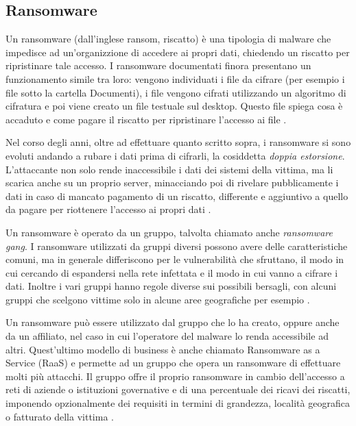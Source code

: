 \documentclass[12pt]{article}
\begin{document}
\subsection{Ransomware}

Un ransomware (dall'inglese ransom, riscatto) è una tipologia di malware che impedisce ad un'organizzione di accedere ai propri dati, chiedendo un riscatto per ripristinare tale accesso. I ransomware documentati finora presentano un funzionamento simile tra loro: vengono individuati i file da cifrare (per esempio i file sotto la cartella Documenti), i file vengono cifrati utilizzando un algoritmo di cifratura e poi viene creato un file testuale sul desktop. Questo file spiega cosa è accaduto e come pagare il riscatto per ripristinare l'accesso ai file \cite{noauthor_ransomware_2021}.

Nel corso degli anni, oltre ad effettuare quanto scritto sopra, i ransomware si sono evoluti andando a rubare i dati prima di cifrarli, la cosiddetta \textit{doppia estorsione}. L'attaccante non solo rende inaccessibile i dati dei sistemi della vittima, ma li scarica anche su un proprio server, minacciando poi di rivelare pubblicamente i dati in caso di mancato pagamento di un riscatto, differente e aggiuntivo a quello da pagare per riottenere l'accesso ai propri dati \cite{noauthor_what_2022-2}.

Un ransomware è operato da un gruppo, talvolta chiamato anche \textit{ransomware gang}. I ransomware utilizzati da gruppi diversi possono avere delle caratteristiche comuni, ma in generale differiscono per le vulnerabilità che sfruttano, il modo in cui cercando di espandersi nella rete infettata e il modo in cui vanno a cifrare i dati. Inoltre i vari gruppi hanno regole diverse sui possibili bersagli, con alcuni gruppi che scelgono vittime solo in alcune aree geografiche per esempio \cite{noauthor_ransomware_2022-4}.

Un ransomware può essere utilizzato dal gruppo che lo ha creato, oppure anche da un affiliato, nel caso in cui l'operatore del malware lo renda accessibile ad altri. Quest'ultimo modello di business è anche chiamato Ransomware as a Service (RaaS) e permette ad un gruppo che opera un ransomware di effettuare molti più attacchi. Il gruppo offre il proprio ransomware in cambio dell'accesso a reti di aziende o istituzioni governative e di una percentuale dei ricavi dei riscatti, imponendo opzionalmente dei requisiti in termini di grandezza, località geografica o fatturato della vittima \cite{noauthor_ransomware_2022-3} \cite{noauthor_what_2022-1}.
\end{document}
